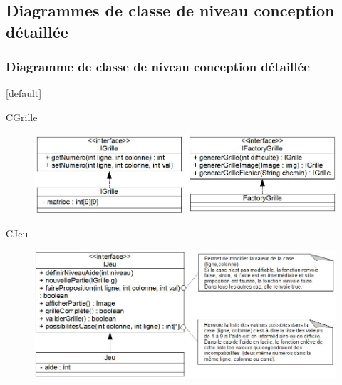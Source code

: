 \documentclass{beamer}
\begin{document}
\subsection{Diagrammes de classe de niveau conception détaillée}

\begin{frame}
\frametitle{Diagramme de classe de niveau conception détaillée}
  [default]
  \begin{block}{\footnotesize{CGrille}}
    \begin{figure}[h]
      \includegraphics[scale=0.37]{diagramme_classe_detaillee_CGrille.JPG}
    \end{figure}
  \end{block}
  \pause
  \begin{block}{\footnotesize{CJeu}}
    \begin{figure}[h]
      \includegraphics[scale=0.37]{diagramme_classe_detaillee_CJeu.JPG}
    \end{figure}
  \end{block}
\end{frame}
\end{document}
